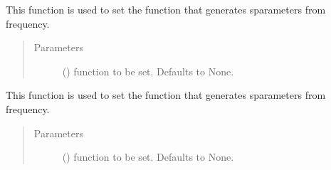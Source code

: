 \documentclass[letterpaper,10pt,english]{sphinxmanual}
\begin{document}
\begin{fulllineitems}
\begin{fulllineitems}
\end{fulllineitems}


\begin{fulllineitems}
\label{\detokenize{touchstone:touchstone.spfile.set_sparam_gen_func}}
This function is used to set the function that generates s\sphinxhyphen{}parameters from frequency.
\begin{quote}\begin{description}
\item[{Parameters}] \leavevmode
{} (\sphinxstyleliteralemphasis{\sphinxupquote{, }}) \textendash{} function to be set. Defaults to None.

\end{description}\end{quote}

\end{fulllineitems}


\begin{fulllineitems}
\label{\detokenize{touchstone:touchstone.spfile.set_sparam_mod_func}}
This function is used to set the function that generates s\sphinxhyphen{}parameters from frequency.
\begin{quote}\begin{description}
\item[{Parameters}] \leavevmode
{} (\sphinxstyleliteralemphasis{\sphinxupquote{, }}) \textendash{} function to be set. Defaults to None.

\end{description}\end{quote}

\end{fulllineitems}


\end{fulllineitems}
\end{document}
